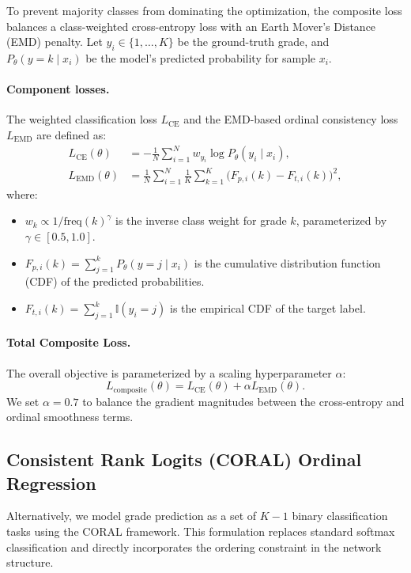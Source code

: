 \documentclass[12pt]{article}
\begin{document}
To prevent majority classes from dominating the optimization, the composite loss balances a class-weighted cross-entropy loss with an Earth Mover's Distance (EMD) penalty.
Let $y_i \in \{1,\dots,K\}$ be the ground-truth grade, and $P_\theta(y=k \mid x_i)$ be the model's predicted probability for sample $x_i$.

\paragraph{Component losses.}
The weighted classification loss $L_{\text{CE}}$ and the EMD-based ordinal consistency loss $L_{\text{EMD}}$ are defined as:
\begin{align}
L_{\text{CE}}(\theta) &= 
-\frac{1}{N}\sum_{i=1}^{N} 
w_{y_i} \log P_\theta(y_i \mid x_i), \\
L_{\text{EMD}}(\theta) &= 
\frac{1}{N}\sum_{i=1}^{N} \frac{1}{K}\sum_{k=1}^{K}\big(F_{p,i}(k)-F_{t,i}(k)\big)^2,
\end{align}
where:
\begin{itemize}
  \item $w_k \propto 1/\text{freq}(k)^\gamma$ is the inverse class weight for grade $k$, parameterized by $\gamma \in [0.5, 1.0]$.
  \item $F_{p,i}(k) = \sum_{j=1}^{k} P_\theta(y=j \mid x_i)$ is the cumulative distribution function (CDF) of the predicted probabilities.
  \item $F_{t,i}(k) = \sum_{j=1}^{k} \mathbb{I}(y_i = j)$ is the empirical CDF of the target label.
\end{itemize}

\paragraph{Total Composite Loss.}
The overall objective is parameterized by a scaling hyperparameter $\alpha$:
\begin{equation}
L_{\text{composite}}(\theta) = L_{\text{CE}}(\theta) + \alpha L_{\text{EMD}}(\theta).
\end{equation}
We set $\alpha = 0.7$ to balance the gradient magnitudes between the cross-entropy and ordinal smoothness terms.

\subsection{Consistent Rank Logits (CORAL) Ordinal Regression}
Alternatively, we model grade prediction as a set of $K-1$ binary classification tasks using the CORAL framework.
This formulation replaces standard softmax classification and directly incorporates the ordering constraint in the network structure.
\end{document}
